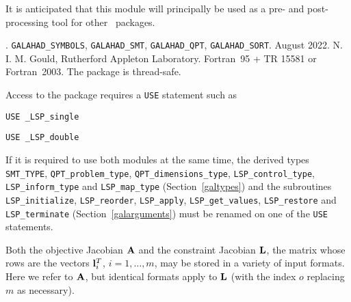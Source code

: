 \documentclass{galahad}
\newcommand{\packagename}{LSP}
\newcommand{\fullpackagename}{\libraryname\_\packagename}
\begin{document}
It is anticipated that this module will principally be used as a pre- and 
post-processing tool for other \galahad\ packages.


\galattributes
\galversions{\tt  \fullpackagename\_single, \fullpackagename\_double}.
\galuses
{\tt GALAHAD\_SY\-M\-BOLS}, 
{\tt GALAHAD\_SMT}, 
{\tt GALAHAD\_QPT},
{\tt GALAHAD\_SORT}.
\galdate August 2022.
\galorigin N. I. M. Gould, Rutherford Appleton Laboratory.
\gallanguage Fortran~95 + TR 15581 or Fortran~2003. 
The package is thread-safe.


\galhowto


Access to the package requires a {\tt USE} statement such as

\medskip{}

\hspace{8mm} {\tt USE \fullpackagename\_single}

\medskip{}

\hspace{8mm} {\tt USE  \fullpackagename\_double}

\medskip

\noindent
If it is required to use both modules at the same time, the derived types 
{\tt SMT\_TYPE},
{\tt QPT\_problem\_type},
{\tt QPT\_dimensions\_type}, 
{\tt \packagename\_control\_type}, 
\sloppy
{\tt \packagename\_inform\_type} 
and
{\tt \packagename\_map\_type}
(Section~\ref{galtypes})
and the subroutines
{\tt \packagename\_initialize}, 
{\tt \packagename\_reorder},
{\tt \packagename\_apply}, 
{\tt \packagename\_get\_values}, 
{\tt \packagename\_restore}
and
{\tt \packagename\_terminate} 
(Section~\ref{galarguments})
must be renamed on one of the {\tt USE} statements.


\galmatrix

Both the objective Jacobian ${\mathbf{A}}$ and
the constraint Jacobian ${\mathbf{L}}$, the matrix 
whose rows are the vectors ${\mathbf{l}}_{i}^{T}$, $i = 1, \ldots , m$, 
may be stored in a variety of input formats. Here we refer to ${\mathbf{A}}$, but
identical formats apply to ${\mathbf{L}}$ (with the index $o$ replacing $m$ as
necessary).
\end{document}
